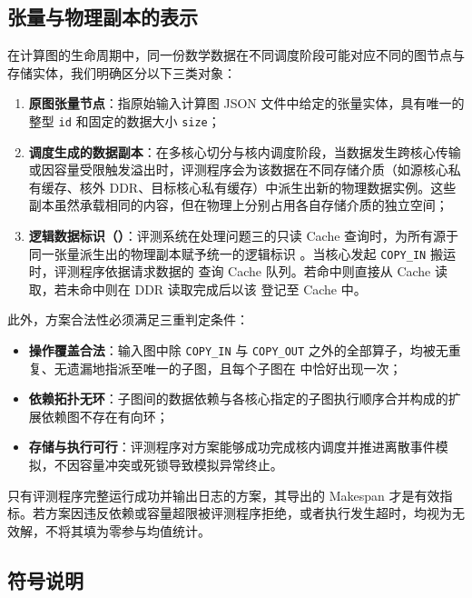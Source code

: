 \documentclass[anonymous,withtoc]{gmcm2026}
\providecommand{\tightlist}{\setlength{\itemsep}{0pt}\setlength{\parskip}{0pt}}
\begin{document}
\subsection{张量与物理副本的表示}

在计算图的生命周期中，同一份数学数据在不同调度阶段可能对应不同的图节点与存储实体，我们明确区分以下三类对象：

\begin{enumerate}
\def\labelenumi{\arabic{enumi}.}
\tightlist
\item
  \textbf{原图张量节点}：指原始输入计算图 JSON 文件中给定的张量实体，具有唯一的整型 \texttt{id} 和固定的数据大小 \texttt{size}；
\item
  \textbf{调度生成的数据副本}：在多核心切分与核内调度阶段，当数据发生跨核心传输或因容量受限触发溢出时，评测程序会为该数据在不同存储介质（如源核心私有缓存、核外 DDR、目标核心私有缓存）中派生出新的物理数据实例。这些副本虽然承载相同的内容，但在物理上分别占用各自存储介质的独立空间；
\item
  \textbf{逻辑数据标识（\texttt{}）}：评测系统在处理问题三的只读 Cache 查询时，为所有源于同一张量派生出的物理副本赋予统一的逻辑标识 \texttt{}。当核心发起 \texttt{COPY\_IN} 搬运时，评测程序依据请求数据的 \texttt{} 查询 Cache 队列。若命中则直接从 Cache 读取，若未命中则在 DDR 读取完成后以该 \texttt{} 登记至 Cache 中。
\end{enumerate}

此外，方案合法性必须满足三重判定条件：

\begin{itemize}
\tightlist
\item
  \textbf{操作覆盖合法}：输入图中除 \texttt{COPY\_IN} 与 \texttt{COPY\_OUT} 之外的全部算子，均被无重复、无遗漏地指派至唯一的子图，且每个子图在 \texttt{} 中恰好出现一次；
\item
  \textbf{依赖拓扑无环}：子图间的数据依赖与各核心指定的子图执行顺序合并构成的扩展依赖图不存在有向环；
\item
  \textbf{存储与执行可行}：评测程序对方案能够成功完成核内调度并推进离散事件模拟，不因容量冲突或死锁导致模拟异常终止。
\end{itemize}

只有评测程序完整运行成功并输出日志的方案，其导出的 Makespan 才是有效指标。若方案因违反依赖或容量超限被评测程序拒绝，或者执行发生超时，均视为无效解，不将其填为零参与均值统计。

\subsection{符号说明}
\end{document}
